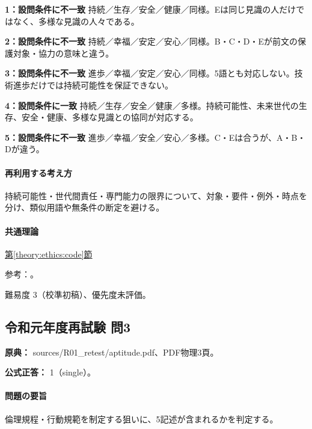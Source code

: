 \noindent\textbf{1：設問条件に不一致} 持続／生存／安全／健康／同様。Eは同じ見識の人だけではなく、多様な見識の人々である。\par

\noindent\textbf{2：設問条件に不一致} 持続／幸福／安定／安心／同様。B・C・D・Eが前文の保護対象・協力の意味と違う。\par

\noindent\textbf{3：設問条件に不一致} 進歩／幸福／安定／安心／同様。5語とも対応しない。技術進歩だけでは持続可能性を保証できない。\par

\noindent\textbf{4：設問条件に一致} 持続／生存／安全／健康／多様。持続可能性、未来世代の生存、安全・健康、多様な見識との協同が対応する。\par

\noindent\textbf{5：設問条件に不一致} 進歩／幸福／安全／安心／多様。C・Eは合うが、A・B・Dが違う。\par

\paragraph{再利用する考え方} 持続可能性・世代間責任・専門能力の限界について、対象・要件・例外・時点を分け、類似用語や無条件の断定を避ける。

\paragraph{共通理論} \hyperref[theory:ethics:code]{第\ref*{theory:ethics:code}節}

\par 参考：\cite{ieej_conduct2007}。

\par 難易度 3（校準初稿）、優先度未評価。

\subsection{令和元年度再試験 問3}
\label{q:r01-ret-apt-03}

\noindent\textbf{原典：} sources/R01\_retest/aptitude.pdf、PDF物理3頁。

\textbf{公式正答：} 1（single）。

\paragraph{問題の要旨} 倫理規程・行動規範を制定する狙いに、5記述が含まれるかを判定する。

